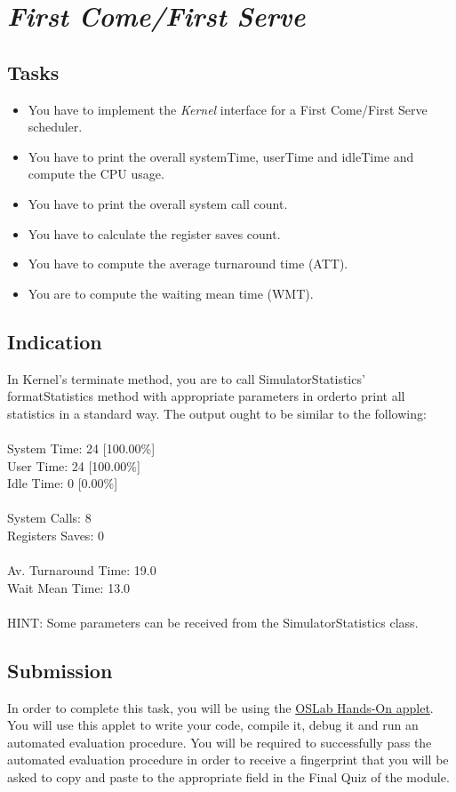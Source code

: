 \documentclass[11pt,a4paper]{scrreprt}
\begin{document}
\section{\textit{First Come/First Serve}}
\subsection{Tasks}
\begin{itemize}
\item You have to implement the \textit{Kernel} interface for a First Come/First Serve scheduler.
\item You have to print the overall systemTime, userTime and idleTime and compute the CPU usage.
\item You have to print the overall system call count.
\item You have to calculate the register saves count.
\item You have to compute the average turnaround time (ATT).
\item You are to compute the waiting mean time (WMT).
\end{itemize}

\subsection{Indication}
In Kernel's terminate method, you are to call SimulatorStatistics' formatStatistics method with appropriate parameters in orderto print all statistics in a standard way. The output ought to be similar to the following: \\\\
System Time: 24 [100.00\%]\\
User Time: 24 [100.00\%]\\
Idle Time: 0 [0.00\%]\\\\
System Calls: 8\\
Registers Saves: 0\\\\
Av. Turnaround Time: 19.0\\
Wait Mean Time: 13.0\\\\
HINT: Some parameters can be received from the SimulatorStatistics class.

\subsection{Submission}
In order to complete this task, you will be using the \href{https://oslab.unine.ch/portal/modules/0/oslab.jsp}{OSLab Hands-On applet}. You will use this applet to write your code, compile it, debug it and run an automated evaluation procedure. You will be required to successfully pass the automated evaluation procedure in order to receive a fingerprint that you will be asked to copy and paste to the appropriate field in the Final Quiz of the module.
\end{document}
